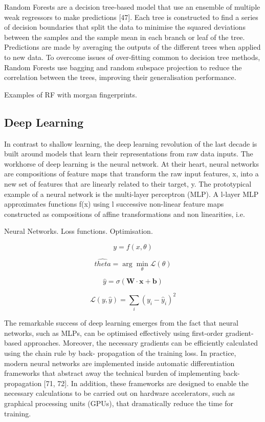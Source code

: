 Random Forests are a decision tree-based model that use an ensemble of multiple weak regressors to make predictions [47]. Each tree is constructed to find a series of decision boundaries that split the data to minimise the squared deviations between the samples and the sample mean in each branch or leaf of the tree. Predictions are made by averaging the outputs of the different trees when applied to new data. To overcome issues of over-fitting common to decision tree methods, Random Forests use bagging and random subspace projection to reduce the correlation between the trees, improving their generalisation performance.

Examples of RF with morgan fingerprints.
\subsection{Deep Learning}

In contrast to shallow learning, the deep learning revolution of the last decade is built around models that learn their representations from raw data inputs. The workhorse of deep learning is the neural network. At their heart, neural networks are compositions of feature maps that transform the raw input features, x, into a new set of features that are linearly related to their target, y. The prototypical example of a neural network is the multi-layer perceptron (MLP). A l-layer MLP approximates functions f(x) using l successive non-linear feature maps constructed as compositions of affine transformations and non linearities, i.e.

Neural Networks. Loss functions. Optimisation.

\begin{equation}
    y = f(x, \theta)
\end{equation}

\begin{equation}
    \hat{theta} = \arg\min_{\theta} \mathcal{L}(\theta)
\end{equation}

\begin{equation}
    \hat{y} = \sigma(\mathbf{W} \cdot \mathbf{x} + \mathbf{b})
\end{equation}

\begin{equation}
    \mathcal{L}(y, \hat{y}) = \sum_{i}(y_i - \hat{y}_i)^{2}
\end{equation}

The remarkable success of deep learning emerges from the fact that neural networks, such as MLPs, can be optimised effectively using first-order gradient-based approaches. Moreover, the necessary gradients can be efficiently calculated using the chain rule by back- propagation of the training loss. In practice, modern neural networks are implemented inside automatic differentiation frameworks that abstract away the technical burden of implementing back-propagation [71, 72]. In addition, these frameworks are designed to enable the necessary calculations to be carried out on hardware accelerators, such as graphical processing units (GPUs), that dramatically reduce the time for training.

